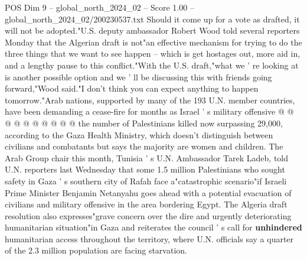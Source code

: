 \begin{textsample}{POS Dim 9 – global\_north\_2024\_02 – Score 1.00 – global\_north\_2024\_02/200230537.txt}
Should it come up for a vote as drafted, it will not be adopted."U.S. deputy ambassador Robert Wood told several reporters Monday that the Algerian draft is not"an effective mechanism for trying to do the three things that we want to see happen -- which is get hostages out, more aid in, and a lengthy pause to this conflict."With the U.S. draft,"what we ' re looking at is another possible option and we ' ll be discussing this with friends going forward,"Wood said."I don't think you can expect anything to happen tomorrow."Arab nations, supported by many of the 193 U.N. member countries, have been demanding a cease-fire for months as Israel ' s military offensive @ @ @ @ @ @ @ @ @ @ the number of Palestinians killed now surpassing 29,000, according to the Gaza Health Ministry, which doesn't distinguish between civilians and combatants but says the majority are women and children.
The Arab Group chair this month, Tunisia ' s U.N.
Ambassador Tarek Ladeb, told U.N. reporters last Wednesday that some 1.5 million Palestinians who sought safety in Gaza ' s southern city of Rafah face a"catastrophic scenario"if Israeli Prime Minister Benjamin Netanyahu goes ahead with a potential evacuation of civilians and military offensive in the area bordering Egypt.
The Algeria draft resolution also expresses"grave concern over the dire and urgently deteriorating humanitarian situation"in Gaza and reiterates the council ' s call for \textbf{unhindered} humanitarian access throughout the territory, where U.N. officials say a quarter of the 2.3 million population are facing starvation.

\end{textsample}
